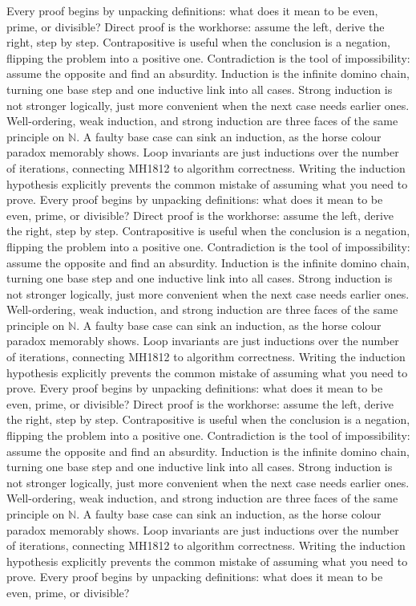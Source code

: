 Every proof begins by unpacking definitions: what does it mean to be even, prime, or divisible?
Direct proof is the workhorse: assume the left, derive the right, step by step.
Contrapositive is useful when the conclusion is a negation, flipping the problem into a positive one.
Contradiction is the tool of impossibility: assume the opposite and find an absurdity.
Induction is the infinite domino chain, turning one base step and one inductive link into all cases.
Strong induction is not stronger logically, just more convenient when the next case needs earlier ones.
Well-ordering, weak induction, and strong induction are three faces of the same principle on $\mathbb{N}$.
A faulty base case can sink an induction, as the horse colour paradox memorably shows.
Loop invariants are just inductions over the number of iterations, connecting MH1812 to algorithm correctness.
Writing the induction hypothesis explicitly prevents the common mistake of assuming what you need to prove.
Every proof begins by unpacking definitions: what does it mean to be even, prime, or divisible?
Direct proof is the workhorse: assume the left, derive the right, step by step.
Contrapositive is useful when the conclusion is a negation, flipping the problem into a positive one.
Contradiction is the tool of impossibility: assume the opposite and find an absurdity.
Induction is the infinite domino chain, turning one base step and one inductive link into all cases.
Strong induction is not stronger logically, just more convenient when the next case needs earlier ones.
Well-ordering, weak induction, and strong induction are three faces of the same principle on $\mathbb{N}$.
A faulty base case can sink an induction, as the horse colour paradox memorably shows.
Loop invariants are just inductions over the number of iterations, connecting MH1812 to algorithm correctness.
Writing the induction hypothesis explicitly prevents the common mistake of assuming what you need to prove.
Every proof begins by unpacking definitions: what does it mean to be even, prime, or divisible?
Direct proof is the workhorse: assume the left, derive the right, step by step.
Contrapositive is useful when the conclusion is a negation, flipping the problem into a positive one.
Contradiction is the tool of impossibility: assume the opposite and find an absurdity.
Induction is the infinite domino chain, turning one base step and one inductive link into all cases.
Strong induction is not stronger logically, just more convenient when the next case needs earlier ones.
Well-ordering, weak induction, and strong induction are three faces of the same principle on $\mathbb{N}$.
A faulty base case can sink an induction, as the horse colour paradox memorably shows.
Loop invariants are just inductions over the number of iterations, connecting MH1812 to algorithm correctness.
Writing the induction hypothesis explicitly prevents the common mistake of assuming what you need to prove.
Every proof begins by unpacking definitions: what does it mean to be even, prime, or divisible?

